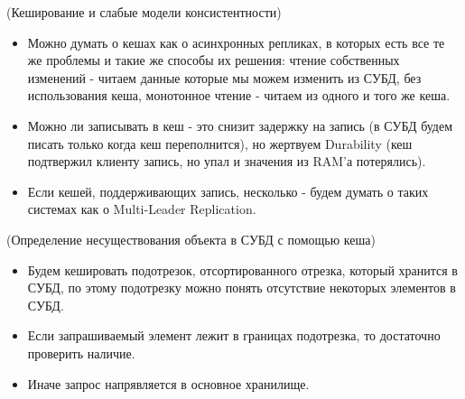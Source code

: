 \begin{algorithm}(Кеширование и слабые модели консистентности)
    \begin{itemize}
        \item Можно думать о кешах как о асинхронных репликах, в которых есть все те же проблемы и такие же способы их решения: чтение собственных изменений - читаем данные которые мы можем изменить из СУБД, без использования кеша, монотонное чтение - читаем из одного и того же кеша.
        \item Можно ли записывать в кеш - это снизит задержку на запись (в СУБД будем писать только когда кеш переполнится), но жертвуем Durability (кеш подтвержил клиенту запись, но упал и значения из RAM'а потерялись).
        \item Если кешей, поддерживающих запись, несколько - будем думать о таких системах как о Multi-Leader Replication.
    \end{itemize}
\end{algorithm}

\begin{algorithm}(Определение несуществования объекта в СУБД с помощью кеша)
    \begin{itemize}
        \item Будем кешировать подотрезок, отсортированного отрезка, который хранится в СУБД, по этому подотрезку можно понять отсутствие некоторых элементов в СУБД.
        \item Если запрашиваемый элемент лежит в границах подотрезка, то достаточно проверить наличие.
        \item Иначе запрос напрявляется в основное хранилище.
    \end{itemize}
\end{algorithm}
